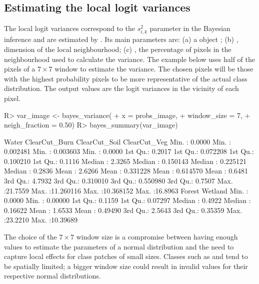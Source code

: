 \documentclass[
  shortnames]{jss}
\begin{document}
\subsection{Estimating the local logit variances}\label{estimating-the-local-logit-variances}

The local logit variances correspond to the \(s^2_{i,k}\) parameter in the Bayesian inference and are estimated by . Its main parameters are: (a) a  object ; (b) , dimension of the local neighbourhood; (c) , the percentage of pixels in the neighbourhood used to calculate the variance. The example below uses half of the pixels of a \(7\times 7\) window to estimate the variance. The chosen pixels will be those with the highest probability pixels to be more representative of the actual class distribution. The output values are the logit variances in the vicinity of each pixel.

\begin{CodeChunk}
\begin{CodeInput}
R> var_image <- bayes_variance(
+     x = probs_image,
+     window_size = 7,
+     neigh_fraction = 0.50)
R> bayes_summary(var_image)
\end{CodeInput}
\begin{CodeOutput}
 Water             ClearCut_Burn       ClearCut_Soil       ClearCut_Veg     
 Min.   : 0.0000   Min.   : 0.002481   Min.   : 0.003603   Min.   : 0.0000  
 1st Qu.: 0.2017   1st Qu.: 0.072208   1st Qu.: 0.100210   1st Qu.: 0.1116  
 Median : 2.3265   Median : 0.150143   Median : 0.225121   Median : 0.2836  
 Mean   : 2.6266   Mean   : 0.331228   Mean   : 0.614570   Mean   : 0.6481  
 3rd Qu.: 4.7932   3rd Qu.: 0.310010   3rd Qu.: 0.550980   3rd Qu.: 0.7507  
 Max.   :21.7559   Max.   :11.260116   Max.   :10.368152   Max.   :16.8963  
 Forest            Wetland           
 Min.   : 0.0000   Min.   : 0.00000  
 1st Qu.: 0.1159   1st Qu.: 0.07297  
 Median : 0.4922   Median : 0.16622  
 Mean   : 1.6533   Mean   : 0.49490  
 3rd Qu.: 2.5643   3rd Qu.: 0.35359  
 Max.   :23.2210   Max.   :10.39689  
\end{CodeOutput}
\end{CodeChunk}

The choice of the \(7 \times 7\) window size is a compromise between having enough values to estimate the parameters of a normal distribution and the need to capture local effects for class patches of small sizes. Classes such as  and  tend to be spatially limited; a bigger window size could result in invalid values for their respective normal distributions.
\end{document}
